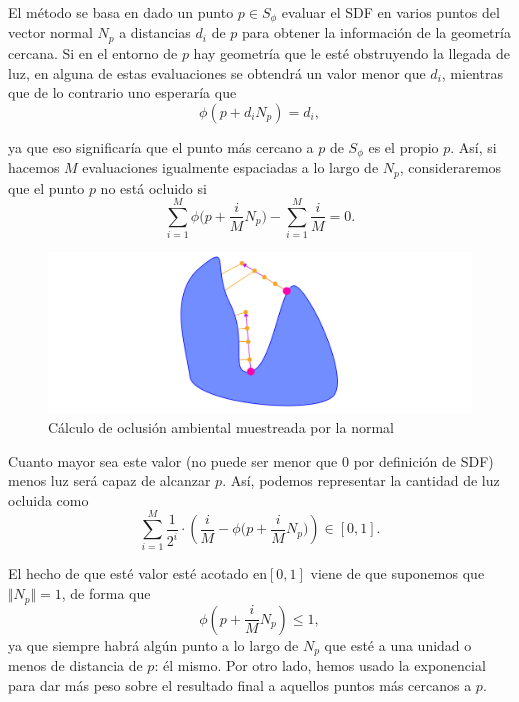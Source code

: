 El método se basa en dado un punto $p\in S_{\phi}$ evaluar el SDF en varios puntos del vector normal $N_p$ a distancias $d_i$ de $p$ para obtener la información de la geometría cercana. Si en el entorno de $p$ hay geometría que le esté obstruyendo la llegada de luz, en alguna de estas evaluaciones se obtendrá un valor menor que $d_i$, mientras que de lo contrario uno esperaría que
\begin{equation*}
    \phi(p + d_i N_p) = d_i,
\end{equation*}

ya que eso significaría que el punto más cercano a $p$ de $S_{\phi}$ es el propio $p$. Así, si hacemos $M$ evaluaciones igualmente espaciadas a lo largo de $N_p$, consideraremos que el punto $p$ no está ocluido si
\begin{equation*}
    \sum_{i=1}^M \phi\Big(p + \frac{i}{M} N_p\Big) - \sum_{i=1}^M \frac{i}{M} = 0.
\end{equation*}

\begin{figure}[ht!]
    \centering
    \includegraphics[width=\textwidth]{Plantilla-TFG-master/img/diagramaAO.png}
    \caption{Cálculo de oclusión ambiental muestreada por la normal}
    \label{fig:sombras4}
\end{figure}

Cuanto mayor sea este valor (no puede ser menor que $0$ por definición de SDF) menos luz será capaz de alcanzar $p$. Así, podemos representar la cantidad de luz ocluida como
\begin{equation*}
    \sum_{i=1}^M \frac{1}{2^i}\cdot \left(\frac{i}{M} - \phi\Big(p + \frac{i}{M} N_p\Big)\right)\in [0,1].
\end{equation*}

El hecho de que esté valor esté acotado en$[0,1]$ viene de que suponemos que $\Vert N_p\Vert = 1$, de forma que
\begin{equation*}
    \phi\left(p + \frac{i}{M} N_p\right) \le 1,
\end{equation*}
ya que siempre habrá algún punto a lo largo de $N_p$ que esté a una unidad o menos de distancia de $p$: él mismo. Por otro lado, hemos usado la exponencial para dar más peso sobre el resultado final a aquellos puntos más cercanos a $p$.\newline

